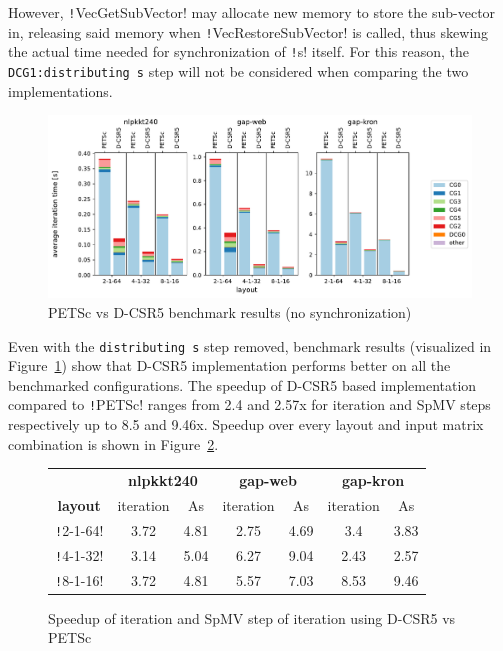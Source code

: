 \documentclass[thesis=M,english]{FITthesis}[2019/12/23]
\newcommand{\csre}[1]{\texttt!#1!}
\begin{document}
However, \csre{VecGetSubVector} may allocate new memory to store the sub-vector in, releasing said memory
when \csre{VecRestoreSubVector} is called, thus skewing the actual time needed for synchronization of
\csre{s} itself. For this reason, the \texttt{DCG1:distributing s} step will not be considered when comparing
the two implemen\-tations.

\begin{figure}[htp]
    \centering
    \includegraphics[scale=0.5]{static/petsc_vs_dim.pdf}
    \caption{PETSc vs D-CSR5 benchmark results (no synchronization)}\label{bench:petsc:vsDim}
\end{figure}

Even with the \texttt{distributing s} step removed, benchmark results (visualized in
Figure~\ref{bench:petsc:vsDim}) show that D-CSR5 implementation performs better
on all the benchmarked configurations. The speedup of D-CSR5 based implementation compared to \csre{PETSc}
ranges from 2.4 and 2.57x for iteration and SpMV steps respectively up to 8.5 and 9.46x. Speedup over every
layout and input matrix combination is shown in Figure~\ref{bench:petsc:table}.


\begin{figure}[htp]
    \centering
    \begin{tabular}{*{7}{c}}
        \toprule
                        & \multicolumn{2}{c}{\textbf{nlpkkt240}} & \multicolumn{2}{c}{\textbf{gap-web}} & \multicolumn{2}{c}{\textbf{gap-kron}}                           \\
        \cmidrule(lr){2-3} \cmidrule(lr){4-5} \cmidrule(lr){6-7}
        \textbf{layout} & iteration                              & As                                   & iteration                             & As   & iteration & As   \\
        \midrule
        \csre{2-1-64}   & 3.72                                   & 4.81                                 & 2.75                                  & 4.69 & 3.4       & 3.83 \\
        \csre{4-1-32}   & 3.14                                   & 5.04                                 & 6.27                                  & 9.04 & 2.43      & 2.57 \\
        \csre{8-1-16}   & 3.72                                   & 4.81                                 & 5.57                                  & 7.03 & 8.53      & 9.46 \\
        \bottomrule
    \end{tabular}
    \caption{Speedup of iteration and SpMV step of iteration using D-CSR5 vs PETSc}\label{bench:petsc:table}
\end{figure}
\end{document}
